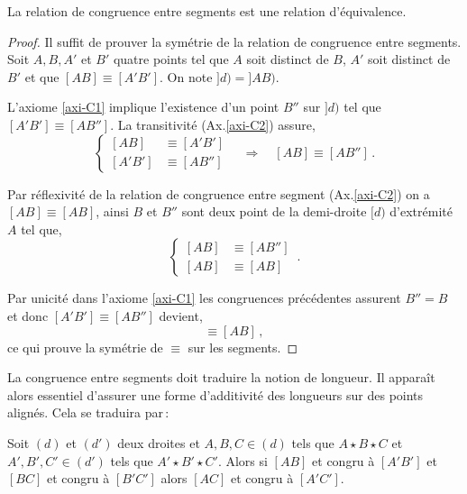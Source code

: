\begin{thm}\label{thm-congsegmentequiv}
    La relation de congruence entre segments est une relation d'équivalence.
\begin{proof}
    Il suffit de prouver la symétrie de la relation de congruence entre segments. Soit $A,B,A'$ et $B'$ quatre points tel que $A$ soit distinct de $B$, $A'$ soit distinct de $B'$ et que $[AB]\equiv[A'B']$. On note $]d)=]AB)$. 
    
    L'axiome \ref{axi-C1} implique l'existence d'un point $B''$ sur $]d)$ tel que $[A'B']\equiv[AB'']$. La transitivité (Ax.\ref{axi-C2}) assure,
    \begin{equation*}
        \left\{
        \begin{array}{cc}
             \left[AB\right]&\equiv\left[A'B'\right]  \\
             \left[A'B'\right]&\equiv\left[AB''\right]
        \end{array}
        \right.\quad \Longrightarrow \quad [AB]\equiv[AB'']\,.
    \end{equation*}
    
    Par réflexivité de la relation de congruence entre segment (Ax.\ref{axi-C2}) on a $[AB]\equiv[AB]$, ainsi $B$ et $B''$ sont deux point de la demi-droite $[d)$ d'extrémité $A$ tel que,
    \begin{equation*}
        \left\{
        \begin{array}{cc}
             \left[AB\right]& \equiv \left[AB''\right]  \\
             \left[AB\right]&\equiv \left[AB \right]
        \end{array}
        \right.\,.
    \end{equation*}
    
    Par unicité dans l'axiome \ref{axi-C1} les congruences précédentes assurent $B''=B$ et donc $[A'B']\equiv[AB'']$ devient,
    \begin{equation*}
        [A'B']\equiv[AB]\,,
    \end{equation*}
    ce qui prouve la symétrie de $\equiv$ sur les segments. 
\end{proof}
\end{thm}
La congruence entre segments doit traduire la notion de longueur. Il apparaît alors essentiel d'assurer une forme d'additivité des longueurs sur des points alignés. Cela se traduira par\,:
\begin{axi}\label{axi-C3}
    Soit $(d)$ et $(d')$ deux droites et $A,B,C \in (d)$ tels que $A \star B \star C$ et $A',B',C' \in (d')$ tels que $A' \star B' \star C'$. Alors si $[AB]$ et congru à $[A'B']$ et $[BC]$ et congru à $[B'C']$ alors $[AC]$ et congru à $[A'C']$.
\end{axi}   
